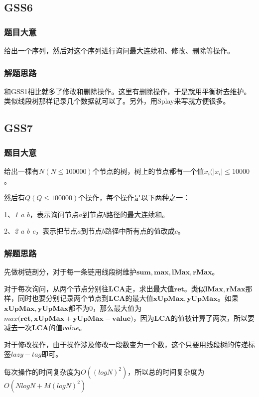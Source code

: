 	\subsection{GSS6}
	\subsubsection{题目大意} \par
	给出一个序列，然后对这个序列进行询问最大连续和、修改、删除等操作。
	\subsubsection{解题思路} \par
	和GSS1相比就多了修改和删除操作。这里有删除操作，于是就用平衡树去维护。类似线段树那样记录几个数据就可以了。另外，用Splay来写就方便很多。


	\subsection{GSS7}
	\subsubsection{题目大意} \par
	给出一棵有$N(N\leq100000)$个节点的树，树上的节点都有一个值$x_i(|x_i|\leq 10000$。\par
	然后有$Q(Q\leq 100000)$个操作，每个操作是以下两种之一：\par
	1、\textsl{1 a b}，表示询问节点$a$到节点$b$路径的最大连续和。\par
	2、\textsl{2 a b c}，表示把节点$a$到节点$b$路径中所有点的值改成$c$。\par
	\subsubsection{解题思路} \par
	先做树链剖分，对于每一条链用线段树维护$\mathbf{sum,max,lMax,rMax}$。\par
	对于每次询问，从两个节点分别往$\mathbf{LCA}$走，求出最大值$\mathbf{ret}$。类似$\mathbf{lMax,rMax}$那样，同时也要分别记录两个节点到$\mathbf{LCA}$的最大值$\mathbf{xUpMax,yUpMax}$。如果$\mathbf{xUpMax,yUpMax}$都不为0，那么最大值为$max(\mathbf{ret,xUpMax+yUpMax-value)}$，因为$\mathbf{LCA}$的值被计算了两次，所以要减去一次$\mathbf{LCA}$的值$value$。\par
	对于修改操作，由于操作涉及修改一段数变为一个数，这个只要用线段树的传递标签$lazy-tag$即可。\par
	每次操作的时间复杂度为$O((logN)^2)$，所以总的时间复杂度为$O(NlogN+M(logN)^2)$


	
